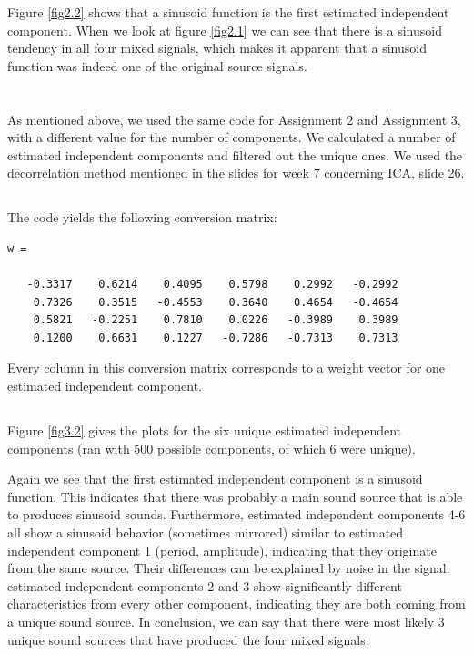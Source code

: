 \documentclass[10pt]{article}
\begin{document}
Figure \ref{fig2.2} shows that a sinusoid function is the first estimated independent component. When we look at figure \ref{fig2.1} we can see that there is a sinusoid tendency in all four mixed signals, which makes it apparent that a sinusoid function was indeed one of the original source signals.

\section{}
As mentioned above, we used the same code for Assignment 2 and Assignment 3, with a different value for the number of components. We calculated a number of estimated independent components and filtered out the unique ones. We used the decorrelation method mentioned in the slides for week 7 concerning ICA, slide 26.

\subsection{}
The code yields the following conversion matrix:

\begin{lstlisting}
w =

   -0.3317    0.6214    0.4095    0.5798    0.2992   -0.2992
    0.7326    0.3515   -0.4553    0.3640    0.4654   -0.4654
    0.5821   -0.2251    0.7810    0.0226   -0.3989    0.3989
    0.1200    0.6631    0.1227   -0.7286   -0.7313    0.7313
\end{lstlisting}
Every column in this conversion matrix corresponds to a weight vector for one estimated independent component.

\subsection{}
Figure \ref{fig3.2} gives the plots for the six unique estimated independent components (ran with 500 possible components, of which 6 were unique). 

Again we see that the first estimated independent component is a sinusoid function. 
This indicates that there was probably a main sound source that is able to produces sinusoid sounds.
Furthermore, estimated independent components 4-6 all show a sinusoid behavior (sometimes mirrored) similar to estimated independent component 1 (period, amplitude), indicating that they originate from the same source.
Their differences can be explained by noise in the signal.
estimated independent components 2 and 3 show significantly different characteristics from every other component,
indicating they are both coming from a unique sound source.
In conclusion, we can say that there were most likely 3 unique sound sources that have produced the four mixed signals.
\end{document}
